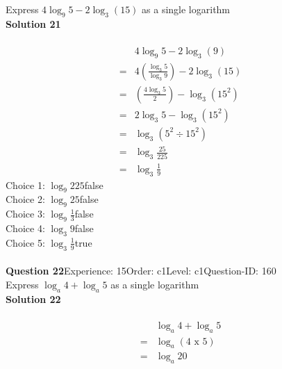 \documentclass{article}
\begin{document}
Express $4\log_{9}5-2\log_{3}(15)$ as a single logarithm\\[4pt]
\noindent\textbf{Solution 21}\\[2pt]
\\[-35pt]\begin{align*}
&4\log_{9}5-2\log_{3}(9)\\[2pt]
=&4\left(\displaystyle\frac{\log_{3}5}{\log_{3}9}\right)-2\log_{3}(15)\\[2pt]
=&\left(\displaystyle\frac{4\log_{3}5}{2}\right)-\log_{3}(15^2)\\[2pt]
=&2\log_{3}5-\log_{3}(15^2)\\[2pt]
=&\log_{3}(5^2 \div 15^2)\\[2pt]
=&\log_{3}\displaystyle\frac{25}{225}\\[2pt]
=&\log_{3}\displaystyle\frac{1}{9}
\end{align*}
Choice 1: \hspace{20pt}$\log_{9}225$\hspace{20pt}false\\
Choice 2: \hspace{20pt}$\log_{9}25$\hspace{20pt}false\\
Choice 3: \hspace{20pt}$\log_{9}\displaystyle\frac{1}{3}$\hspace{20pt}false\\
Choice 4: \hspace{20pt}$\log_{3}9$\hspace{20pt}false\\
Choice 5: \hspace{20pt}$\log_{3}\displaystyle\frac{1}{9}$\hspace{20pt}true\\
\\[4pt]
\noindent\textbf{Question 22}\hspace{20pt}Experience: 15\hspace{20pt}Order: c1\hspace{20pt}Level: c1\hspace{20pt}Question-ID: 160\\[2pt]
Express $\log_{a}4+\log_{a}5$ as a single logarithm\\[4pt]
\noindent\textbf{Solution 22}\\[2pt]
\\[-35pt]\begin{align*}
&\log_{a}4+\log_{a}5\\[2pt]
=&\log_{a}(4 \,\, \text{x} \,\, 5)\\[2pt]
=&\log_{a}20
\end{align*}
\end{document}
